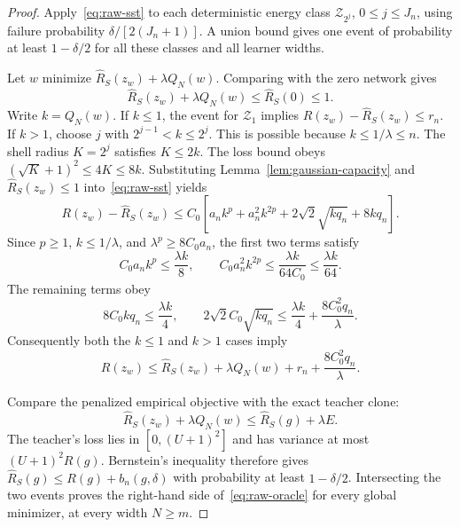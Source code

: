 \begin{proof}
Apply~\eqref{eq:raw-sst} to each deterministic energy class
$\mathcal Z_{2^j}$, $0\leq j\leq J_n$, using failure probability
$\delta/[2(J_n+1)]$.  A union bound gives one event of probability at
least $1-\delta/2$ for all these classes and all learner widths.

Let $w$ minimize $\widehat R_S(z_w)+\lambda Q_N(w)$.  Comparing with
the zero network gives
\begin{equation}
 \widehat R_S(z_w)+\lambda Q_N(w)
   \leq\widehat R_S(0)\leq1.
 \label{eq:raw-training-budget}
\end{equation}
Write $k=Q_N(w)$.  If $k\leq1$, the event for $\mathcal Z_1$ implies
$R(z_w)-\widehat R_S(z_w)\leq r_n$.
If $k>1$, choose $j$ with $2^{j-1}<k\leq2^j$.  This is possible because
$k\leq1/\lambda\leq n$.  The shell radius $K=2^j$ satisfies $K\leq2k$.
The loss bound obeys $(\sqrt K+1)^2\leq4K\leq8k$.
Substituting Lemma~\ref{lem:gaussian-capacity} and
$\widehat R_S(z_w)\leq1$ into~\eqref{eq:raw-sst} yields
\begin{equation}
 R(z_w)-\widehat R_S(z_w)
 \leq C_0\left[a_n k^p+a_n^2 k^{2p}
                    +2\sqrt2\sqrt{kq_n}+8kq_n\right].
 \label{eq:raw-shell-bound}
\end{equation}
Since $p\geq1$, $k\leq1/\lambda$, and
$\lambda^p\geq8C_0a_n$, the first two terms satisfy
\[
 C_0a_n k^p\leq\frac{\lambda k}8,
 \qquad
 C_0a_n^2 k^{2p}\leq\frac{\lambda k}{64C_0}
                     \leq\frac{\lambda k}{64}.
\]
The remaining terms obey
\[
 8C_0kq_n\leq\frac{\lambda k}4,
 \qquad
 2\sqrt2 C_0\sqrt{kq_n}
  \leq\frac{\lambda k}4+\frac{8C_0^2q_n}{\lambda}.
\]
Consequently both the $k\leq1$ and $k>1$ cases imply
\begin{equation}
 R(z_w)\leq\widehat R_S(z_w)+\lambda Q_N(w)
                      +r_n+\frac{8C_0^2q_n}{\lambda}.
 \label{eq:raw-absorbed-deviation}
\end{equation}

Compare the penalized empirical objective with the exact teacher clone:
\[
 \widehat R_S(z_w)+\lambda Q_N(w)
       \leq\widehat R_S(g)+\lambda E.
\]
The teacher's loss lies in $[0,(U+1)^2]$ and has variance at most
$(U+1)^2R(g)$.  Bernstein's inequality therefore gives
$\widehat R_S(g)\leq R(g)+b_n(g,\delta)$ with probability at least
$1-\delta/2$.  Intersecting the two events proves the right-hand side
of~\eqref{eq:raw-oracle} for every global minimizer, at every width
$N\geq m$.


\end{proof}
